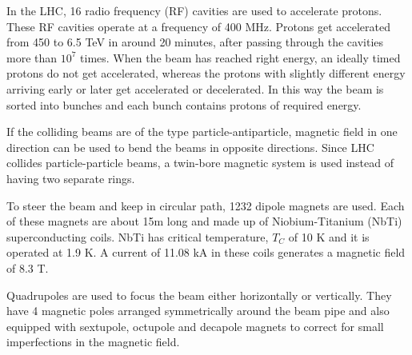 In the LHC, 16 radio frequency (RF) cavities are used to accelerate protons. These RF cavities operate at a frequency of 400 MHz. Protons 
get accelerated from 450 \gev to 6.5 TeV in around 20 minutes, after passing through the cavities more than $10^7$ times. When the
beam has reached right energy, an ideally timed protons do not get accelerated, whereas the protons with slightly different energy
arriving early or later get accelerated or decelerated. In this way the beam is sorted into bunches and each bunch contains
protons of required energy.

If the colliding beams are of the type particle-antiparticle, magnetic field in one direction can be used to bend the beams in opposite 
directions. Since LHC collides particle-particle beams, a twin-bore magnetic system is used instead of having two separate rings.

To steer the beam and keep in circular path, 1232 dipole magnets are used. Each of these magnets are about 15m long and made up of 
Niobium-Titanium (NbTi) superconducting coils. NbTi has critical temperature, $T_C$ of 10 K and it is operated at 1.9 K. A current of 
11.08 kA in these coils generates a magnetic field of 8.3 T.

Quadrupoles are used to focus the beam either horizontally or vertically. They have 4 magnetic poles arranged symmetrically around the 
beam pipe and also equipped with sextupole, octupole and decapole magnets to correct for small imperfections in the magnetic field.

